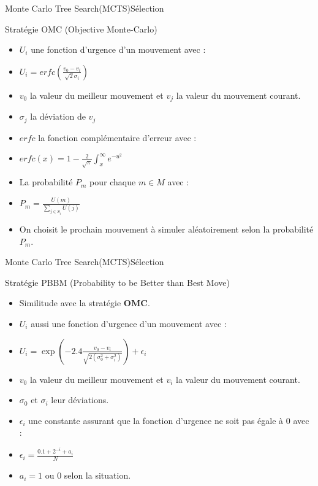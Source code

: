 \begin{frame}{Monte Carlo Tree Search(MCTS)}{Sélection}
	\begin{block}{Stratégie OMC (Objective Monte-Carlo)}
		\begin{itemize}
			\item ${U_{i}}$ une fonction d'urgence d'un mouvement avec :
			\item $U_{i} = erfc \left(\frac{v_{0} - v_{i}}{\sqrt{2}\sigma_{i}}\right)$
			\item $v_{0}$ la valeur du meilleur mouvement et $v_{j}$ la valeur du mouvement courant.
			\item $\sigma_{j}$ la déviation de $v_{j}$
			\item $erfc$ la fonction complémentaire d'erreur avec :
			\item $erfc(x) = 1 - \frac{2}{\sqrt{\pi}}\int_{x}^{\infty}e^{-u^{2}}$
			\item La probabilité $P_{m}$ pour chaque $m \in M$ avec :
			\item $P_{m} = \frac{U(m)}{\sum_{j \in S_{i}}^{}U(j)}$
			\item On choisit le prochain mouvement à simuler aléatoirement selon la probabilité $P_{m}$.
		\end{itemize}
	\end{block}
\end{frame}

\begin{frame}{Monte Carlo Tree Search(MCTS)}{Sélection}
	\begin{block}{Stratégie PBBM (Probability to be Better than Best Move)}
		\begin{itemize}
			\item Similitude avec la stratégie \textbf{OMC}.
			\item $U_{i}$ aussi une fonction d'urgence d'un mouvement avec :
			\item $U_{i} = \exp\left(-2.4\frac{v_{0} - v_{i}}{\sqrt{2(\sigma_{0}^2 + \sigma_{i}^2)}}\right) + \epsilon_{i}$
			\item $v_{0}$ la valeur du meilleur mouvement et $v_{i}$ la valeur du mouvement courant.
			\item $\sigma_{0}$ et $\sigma_{i}$ leur déviations.
			\item $\epsilon_ {i}$ une constante assurant que la fonction d'urgence ne soit pas égale à 0 avec :
			\item $\epsilon_ {i} = \frac{0.1 + 2^{-i} + a_{i}}{N}$
			\item $a_{i} = 1$ ou $0$ selon la situation.
		\end{itemize}
	\end{block}
\end{frame}

